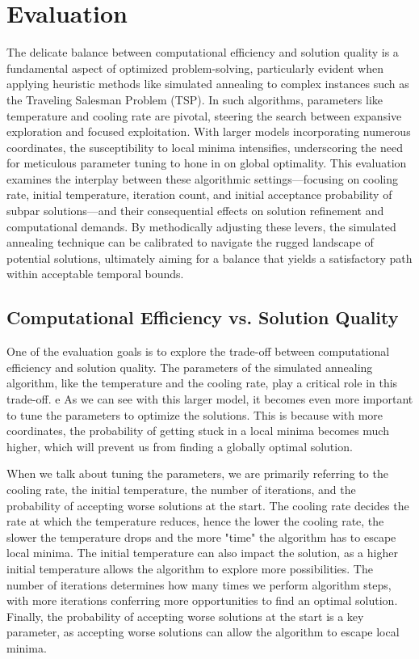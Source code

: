 \documentclass[a4paper,10pt]{article}
\begin{document}
\section{Evaluation}

The delicate balance between computational efficiency and solution quality is a fundamental aspect of optimized problem-solving, particularly evident when applying heuristic methods like simulated annealing to complex instances such as the Traveling Salesman Problem (TSP). In such algorithms, parameters like temperature and cooling rate are pivotal, steering the search between expansive exploration and focused exploitation. With larger models incorporating numerous coordinates, the susceptibility to local minima intensifies, underscoring the need for meticulous parameter tuning to hone in on global optimality. This evaluation examines the interplay between these algorithmic settings—focusing on cooling rate, initial temperature, iteration count, and initial acceptance probability of subpar solutions—and their consequential effects on solution refinement and computational demands. By methodically adjusting these levers, the simulated annealing technique can be calibrated to navigate the rugged landscape of potential solutions, ultimately aiming for a balance that yields a satisfactory path within acceptable temporal bounds.

\subsection{Computational Efficiency vs. Solution Quality}
One of the evaluation goals is to explore the trade-off between computational efficiency and solution quality. The parameters of the simulated annealing algorithm, like the temperature and the cooling rate, play a critical role in this trade-off.
e
As we can see with this larger model, it becomes even more important to tune the parameters to optimize the solutions. This is because with more coordinates, the probability of getting stuck in a local minima becomes much higher, which will prevent us from finding a globally optimal solution. 

When we talk about tuning the parameters, we are primarily referring to the cooling rate, the initial temperature, the number of iterations, and the probability of accepting worse solutions at the start. The cooling rate decides the rate at which the temperature reduces, hence the lower the cooling rate, the slower the temperature drops and the more "time" the algorithm has to escape local minima. The initial temperature can also impact the solution, as a higher initial temperature allows the algorithm to explore more possibilities. The number of iterations determines how many times we perform algorithm steps, with more iterations conferring more opportunities to find an optimal solution. Finally, the probability of accepting worse solutions at the start is a key parameter, as accepting worse solutions can allow the algorithm to escape local minima.
\end{document}
